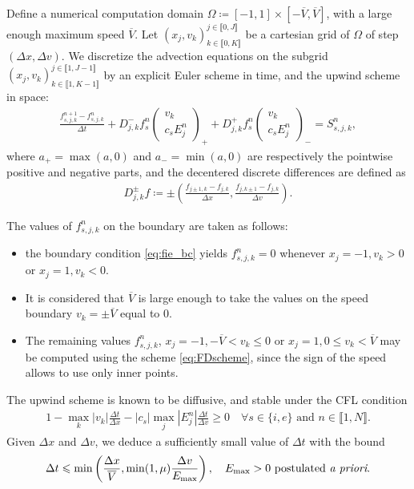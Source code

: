 \documentclass{article}
\numberwithin{equation}{section}
\newcommand{\todo}[1]{{\color{red}\textbf{#1}}}
\newcommand{\vv}[1]{\begin{pmatrix} #1 \end{pmatrix}} %
\begin{document}
Define a numerical computation domain $\Omega \coloneqq [-1,1] \times [-\overline{V},\overline{V}]$, with a large enough maximum speed $\overline{V}$. Let $(x_j, v_k)^{j\in\llbracket0,J\rrbracket}_{k\in\llbracket0,K\rrbracket}$ be a cartesian grid of $\Omega$ of step $(\Delta x, \Delta v)$. We discretize the advection equations on the subgrid $(x_j, v_k)^{j\in\llbracket1,J-1\rrbracket}_{k\in\llbracket1,K-1\rrbracket}$ by an explicit Euler scheme in time, and the upwind scheme in space:
\begin{align}\label{eq:FDscheme}
	\frac{f_{s,j,k}^{n+1} - f_{s,j,k}^{n}}{\Delta t} + D^-_{j,k} f_s^n \vv{v_k\\c_s E_j^n}_{+} +D^+_{j,k} f_s^n \vv{v_k\\c_s E_j^n}_{-} = S_{s,j,k}^n,
\end{align}
where $a_+ = \max(a,0)$ and $a_{-} = \min(a,0)$ are respectively the pointwise positive and negative parts, and the decentered discrete differences are defined as
\begin{align*}
	D^{\pm}_{j,k} f \coloneqq \pm \left(\frac{f_{j\pm 1,k} - f_{j,k}}{\Delta x}, \frac{f_{j,k\pm 1} - f_{j,k}}{\Delta v}\right).
\end{align*}

The values of $f_{s,j,k}^n$ on the boundary are taken as follows:
\begin{itemize}
\item the boundary condition \cref{eq:fie_bc} yields $f_{s,j,k}^n = 0$ whenever $x_j=-1, v_k > 0$ or $x_j=1, v_k < 0$.
\item It is considered that $\overline{V}$ is large enough to take the values on the speed boundary $v_k = \pm \overline{V}$ equal to 0.
\item The remaining values $f_{s,j,k}^n$, $x_j=-1, -\overline{V} < v_k \leqslant 0$ or $x_j=1, 0 \leqslant v_k < \overline{V}$ may be computed using the scheme \cref{eq:FDscheme}, since the sign of the speed allows to use only inner points.
\end{itemize}


The upwind scheme is known to be diffusive, and stable under the CFL condition 
\begin{align*}
	1 - \max_{k} |v_k| \frac{\Delta t}{\Delta x} - |c_s| \max_{j} |E^n_j| \frac{\Delta t}{\Delta v} \geqslant 0 \quad \forall s \in \{i,e\}\text{ and } n \in \llbracket1,N\rrbracket.
\end{align*}
Given $\Delta x$ and $\Delta v$, we deduce a sufficiently small value of $\Delta t$ with the bound
\begin{align*}
	\Delta t \leqslant \min\left(\frac{\Delta x}{\overline{V}}, \min(1,\mu)\frac{\Delta v}{E_{\text{max}}}\right), \quad E_{\text{max}}>0 \text{ postulated \emph{a priori}.}
\end{align*}
\end{document}
